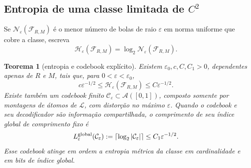 \documentclass[11pt,a4paper]{article}
\theoremstyle{preciso}
\newtheorem{teorema}{Teorema}[section]
\theoremstyle{definition}
\newcommand{\LL}{\mathcal L}
\newcommand{\Asm}{\mathcal A}
\newcommand{\FF}{\mathcal F}
\newcommand{\CC}{\mathcal C}
\newcommand{\eqn}[2]{\begin{equation}\label{eq:#1}#2\end{equation}}
\begin{document}
\subsection{Entropia de uma classe limitada de \texorpdfstring{$C^2$}{C2}}
Se $\mathcal N_\varepsilon(\FF_{R,M})$ é o menor número de bolas de raio $\varepsilon$ em norma uniforme que cobre a classe, escreva
\[
\mathcal H_\varepsilon(\FF_{R,M})=\log_2\mathcal N_\varepsilon(\FF_{R,M}).
\]
\begin{teorema}[entropia e codebook explícito]
Existem $\varepsilon_0,c,C,C_1>0$, dependentes apenas de $R$ e $M$, tais que, para $0<\varepsilon<\varepsilon_0$,
\eqn{86}{c\varepsilon^{-1/2}\le\mathcal H_\varepsilon(\FF_{R,M})\le C\varepsilon^{-1/2}.}
Existe também um codebook finito $\CC_\varepsilon\subset\Asm([0,1])$, composto somente por montagens de átomos de $\LL$, com distorção no máximo $\varepsilon$. Quando o codebook e seu decodificador são informação compartilhada, o comprimento de seu índice global de comprimento fixo é
\eqn{87}{L_\varepsilon^{\rm global}(\CC_\varepsilon):=
\lceil\log_2|\CC_\varepsilon|\rceil\le C_1\varepsilon^{-1/2}.}
Esse codebook atinge em ordem a entropia métrica da classe em cardinalidade e em bits de índice global.
\end{teorema}
\end{document}
